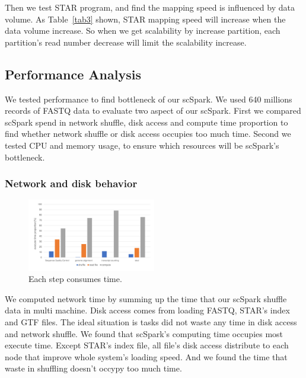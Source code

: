 \documentclass[conference]{IEEEtran}
\begin{document}
  Then we test STAR program, and find the mapping speed is influenced by data volume. 
  As Table~\ref{tab3} shown, STAR mapping speed will increase when the data volume increase. 
  So when we get scalability by increase partition, each partition's read number decrease will limit the scalability increase. 
  
  \subsection{Performance Analysis}
  We tested performance to find bottleneck of our scSpark.
  We used 640 millions records of FASTQ data to evaluate two aspect of our scSpark.
  First we compared scSpark spend in network shuffle, disk access and compute time proportion to find whether network shuffle or disk access occupies too much time.
  Second we tested CPU and memory usage, to ensure which resources will be scSpark's bottleneck.
  
  \subsubsection{Network and disk behavior}
  \begin{figure}
    \includegraphics[width=0.5\textwidth]{fig7.pdf}
    \caption{Each step consumes time.} \label{fig7}
  \end{figure}
  We computed network time by summing up the time that our scSpark shuffle data in multi machine. 
  Disk access comes from loading FASTQ, STAR's index and GTF files. 
  The ideal situation is tasks did not waste any time in disk access and network shuffle. 
  We found that scSpark's computing time occupies most execute time. 
  Except STAR's index file, all file's disk access distribute to each node that improve whole system's loading speed. 
  And we found the time that waste in shuffling doesn't occypy too much time. 
  
\end{document}
